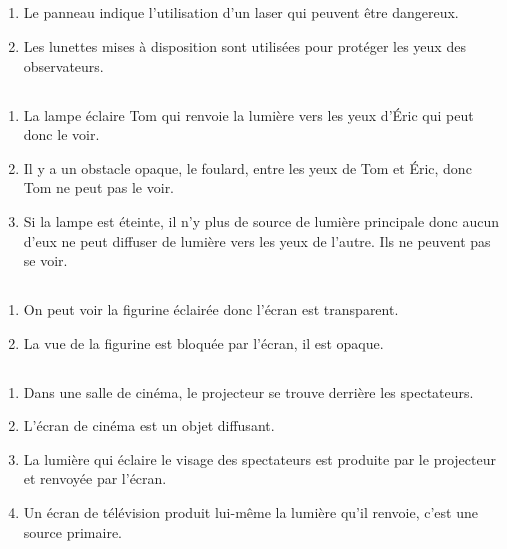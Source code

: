 \documentclass[12pt,a4paper]{article}
\begin{document}
\subsection*{}
	\begin{enumerate}[label=\alph*)]
		\item Le panneau indique l'utilisation d'un laser qui peuvent être dangereux.
		\item Les lunettes mises à disposition sont utilisées pour protéger les yeux des observateurs.
	\end{enumerate}

\subsection*{}
	\begin{enumerate}
		\item La lampe éclaire Tom qui renvoie la lumière vers les yeux d'\'Eric qui peut donc le voir.
		\item Il y a un obstacle opaque, le foulard, entre les yeux de Tom et \'Eric, donc Tom ne peut pas le voir.
		\item Si la lampe est éteinte, il n'y plus de source de lumière principale donc aucun d'eux ne peut diffuser de lumière vers les yeux de l'autre. Ils ne peuvent pas se voir.
	\end{enumerate}

\subsection*{}
	\begin{enumerate}
		\item On peut voir la figurine éclairée donc l'écran est transparent.
		\item La vue de la figurine est bloquée par l'écran, il est opaque.
	\end{enumerate}

\subsection*{}
\begin{enumerate}[label=\alph*)]
	\item Dans une salle de cinéma, le projecteur se trouve derrière les spectateurs.
	\item L'écran de cinéma est un objet diffusant.
	\item La lumière qui éclaire le visage des spectateurs est produite par le projecteur et renvoyée par l'écran.
	\item Un écran de télévision produit lui-même la lumière qu'il renvoie, c'est une source primaire.
\end{enumerate}
\end{document}
